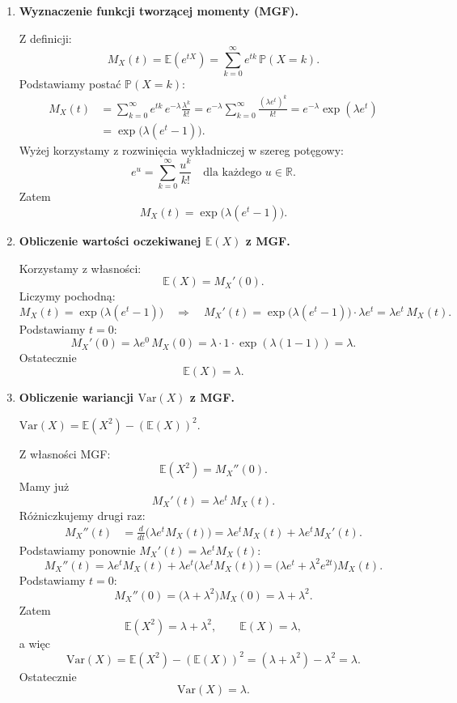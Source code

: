\documentclass[polish, 10pt]{extarticle}
\begin{document}
\begin{enumerate}
\item[a)] \textbf{Wyznaczenie funkcji tworzącej momenty (MGF).}

Z definicji:
\[
M_X(t)=\mathbb{E}\!\left(e^{tX}\right)=\sum_{k=0}^{\infty} e^{tk}\,\mathbb{P}(X=k).
\]
Podstawiamy postać $\mathbb{P}(X=k)$:
\[
\begin{aligned}
M_X(t)
&=\sum_{k=0}^{\infty} e^{tk}\,e^{-\lambda}\frac{\lambda^k}{k!}
= e^{-\lambda}\sum_{k=0}^{\infty}\frac{(\lambda e^t)^k}{k!}
= e^{-\lambda}\exp(\lambda e^t)\\
&=\exp\!\big(\lambda(e^t-1)\big).
\end{aligned}
\]
Wyżej korzystamy z rozwinięcia wykładniczej w szereg potęgowy:
\[
e^u=\sum_{k=0}^{\infty}\frac{u^k}{k!}\quad \text{dla każdego } u\in\mathbb{R}.
\]
Zatem
\[
\boxed{M_X(t)=\exp\!\big(\lambda(e^t-1)\big).}
\]

\item[b)] \textbf{Obliczenie wartości oczekiwanej $\mathbb{E}(X)$ z MGF.}

Korzystamy z własności:
\[
\mathbb{E}(X)=M_X'(0).
\]
Liczymy pochodną:
\[
M_X(t)=\exp\!\big(\lambda(e^t-1)\big)
\quad\Longrightarrow\quad
M_X'(t)=\exp\!\big(\lambda(e^t-1)\big)\cdot \lambda e^t
=\lambda e^t\,M_X(t).
\]
Podstawiamy $t=0$:
\[
M_X'(0)=\lambda e^0\,M_X(0)=\lambda\cdot 1\cdot \exp(\lambda(1-1))=\lambda.
\]
Ostatecznie
\[
\boxed{\mathbb{E}(X)=\lambda.}
\]

\item[c)] \textbf{Obliczenie wariancji $\mathrm{Var}(X)$ z MGF.}

\smallskip
$\mathrm{Var}(X)=\mathbb{E}(X^2)-(\mathbb{E}(X))^2$.

Z własności MGF:
\[
\mathbb{E}(X^2)=M_X''(0).
\]
Mamy już
\[
M_X'(t)=\lambda e^t\,M_X(t).
\]
Różniczkujemy drugi raz:
\[
\begin{aligned}
M_X''(t)
&=\frac{d}{dt}\big(\lambda e^t M_X(t)\big)
=\lambda e^t M_X(t)+\lambda e^t M_X'(t).
\end{aligned}
\]
Podstawiamy ponownie $M_X'(t)=\lambda e^t M_X(t)$:
\[
M_X''(t)=\lambda e^t M_X(t)+\lambda e^t\big(\lambda e^t M_X(t)\big)
=\big(\lambda e^t+\lambda^2 e^{2t}\big)M_X(t).
\]
Podstawiamy $t=0$:
\[
M_X''(0)=\big(\lambda+\lambda^2\big)M_X(0)=\lambda+\lambda^2.
\]
Zatem
\[
\mathbb{E}(X^2)=\lambda+\lambda^2,\qquad \mathbb{E}(X)=\lambda,
\]
a więc
\[
\mathrm{Var}(X)=\mathbb{E}(X^2)-(\mathbb{E}(X))^2
=(\lambda+\lambda^2)-\lambda^2=\lambda.
\]
Ostatecznie
\[
\boxed{\mathrm{Var}(X)=\lambda.}
\]

\end{enumerate}
\end{document}
